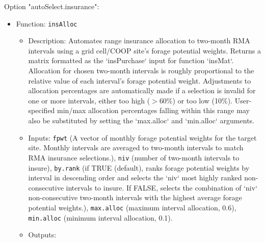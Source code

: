 \documentclass[11pt]{article}
\begin{document}
Option "autoSelect.insurance":
\begin{itemize}
\item Function: \verb!insAlloc!
	\begin{itemize}
	\item Description: Automates range insurance allocation to two-month RMA intervals using a grid cell/COOP site's forage potential weights. Returns a matrix formatted as the `insPurchase` input for function `insMat`. Allocation for chosen two-month intervals is roughly proportional to the relative value of each interval's forage potential weight. Adjustments to allocation percentages are automatically made if a selection is invalid for one or more intervals, either too high ($>$60\%) or too low (10\%). User-specified min/max allocation percentages falling within this range may also be substituted by setting the `max.alloc` and `min.alloc` arguments.
	\item Inputs: \verb!fpwt! (A vector of monthly forage potential weights for the target site. Monthly intervals are averaged to two-month intervals to match RMA insurance selections.), \verb!niv! (number of two-month intervals to insure), \verb!by.rank! (if TRUE (default), ranks forage potential weights by interval in descending order and selects the `niv` most highly ranked non-consecutive intervals to insure. If FALSE, selects the combination of `niv` non-consecutive two-month intervals with the highest average forage potential weights.), \verb!max.alloc!  (maximum interval allocation, 0.6), \verb!min.alloc! (minimum interval allocation, 0.1).
	\item Outputs: 
	\end{itemize}
\end{itemize}
\end{document}
